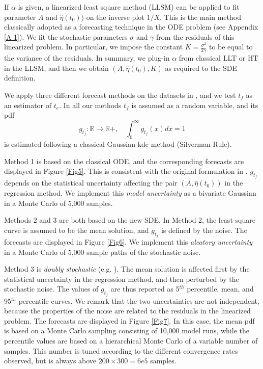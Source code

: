 \documentclass{article}
\begin{document}
If $\alpha$ is given, a linearized least square method (LLSM) can be applied to fit parameter $A$ and $\hat\eta(t_0))$ on the inverse plot $1/X$. This is the main method classically adopted as a forecasting technique in the ODE problem (see Appendix \ref{A-1}). We fit the stochastic parameters $\sigma$ and $\gamma$ from the residuals of this linearized problem. In particular, we impose the constant $K=\frac{\sigma^2}{2\gamma}$ to be equal to the variance of the residuals. In summary, we plug-in $\alpha$ from classical LLT or HT in the LLSM, and then we obtain $\left(A,\hat\eta(t_0),K\right)$ as required to the SDE definition.

We apply three different forecast methods on the datasets in \cite{Voight1988}, and we test $t_f$ as an estimator of $t_e$. In all our methods $t_f$ is assumed as a random variable, and its pdf
$$g_{t_f}:\mathbb R\rightarrow \mathbb R+,\quad \int_0^\infty g_{t_f}(x) dx=1$$
is estimated following a classical Gaussian kde method (Silverman Rule).

Method 1 is based on the classical ODE, and the corresponding forecasts are displayed in Figure \ref{Fig5}. This is consistent with the original formulation in \cite{Voight1988}. $g_{t_f}$ depends on the statistical uncertainty affecting the pair $(A, \hat\eta(t_0))$ in the regression method. We implement this \emph{model uncertainty} as a bivariate Gaussian in a Monte Carlo of 5,000 samples.

Methods 2 and 3 are both based on the new SDE. In Method 2, the least-square curve is assumed to be the mean solution, and $g_{t_f}$ is defined by the noise. The forecasts are displayed in Figure \ref{Fig6}. We implement this \emph{aleatory uncertainty} in a Monte Carlo of 5,000 sample paths of the stochastic noise.

Method 3 is \emph{doubly stochastic} (e.g. \cite{Bevilacqua2016}). The mean solution is affected first by the statistical uncertainty in the regression method, and then perturbed by the stochastic noise. The values of $g_{t_f}$ are thus reported as 5$^{th}$ percentile, mean, and 95$^{th}$ percentile curves. We remark that the two uncertainties are not independent, because the properties of the noise are related to the residuals in the linearized problem. The forecasts are displayed in Figure \ref{Fig7}. In this case, the mean pdf is based on a Monte Carlo sampling consisting of 10,000 model runs, while the percentile values are based on a hierarchical Monte Carlo of a variable number of samples. This number is tuned according to the different convergence rates observed, but is always above $200\times300=6e5$ samples.
\end{document}
